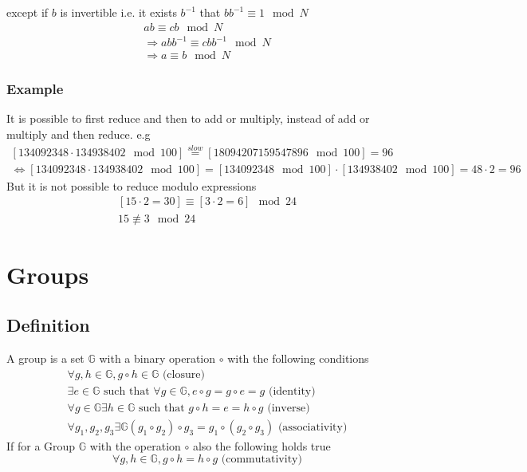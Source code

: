 \documentclass[a4paper]{article}
\begin{document}
except if $b$ is invertible i.e. it exists $b^{-1}$ that $bb^{-1} \equiv  1 \mod N$ 
\begin{equation}
    \begin{split}
	ab \equiv cb \mod N \\
	\Rightarrow abb^{-1} \equiv cbb^{-1} \mod N \\
	\Rightarrow a \equiv b \mod N
    \end{split}
    \label{modulo_arithmetic_multiplication_invertible}
\end{equation}

\subsubsection{Example}
It is possible to first reduce and then to add or multiply, instead of add or multiply and then reduce.
e.g 
\begin{equation*}
    \begin{split}
	[134092348\cdot134938402 \mod 100] \stackrel{slow}{=} [18094207159547896\mod 100] = 96 \\
	\Leftrightarrow[134092348\cdot134938402 \mod 100] = [134092348 \mod 100]\cdot[134938402 \mod 100] = 48\cdot2 = 96 
    \end{split}
\end{equation*}
But it is not possible to reduce modulo expressions
\begin{equation*}
    \begin{split}
	[15 \cdot 2 = 30] \equiv[3 \cdot 2 = 6] \mod 24 \\
	15 \nequiv 3 \mod 24
    \end{split}
\end{equation*}

\section{Groups}
\subsection{Definition}
A group is a set $\mathbb{G}$ with a binary operation $\circ$ with the following conditions
\begin{equation}
    \begin{split}
	\forall g,h \in \mathbb{G}, g \circ h \in \mathbb{G} \text{ (closure)}\\
	\exists e \in \mathbb{G} \text{ such that } \forall g \in \mathbb{G}, e \circ g = g \circ e = g \text{ (identity)} \\
	\forall g \in \mathbb{G} \exists h \in \mathbb{G} \text{ such that } g \circ h = e = h \circ g \text{ (inverse)}\\
	\forall g_1,g_2,g_3 \exists \mathbb{G} (g_1 \circ g_2) \circ g_3 = g_1 \circ (g_2 \circ g_3) \text{ (associativity)}
    \end{split}
    \label{group_definition}
\end{equation}
If for a Group $\mathbb{G}$ with the operation $\circ$ also the following holds true 
\begin{equation}
    \forall g,h \in \mathbb{G}, g \circ h = h \circ g \text{ (commutativity)}
    \label{group_abelian_defintion}
\end{equation}
\end{document}
